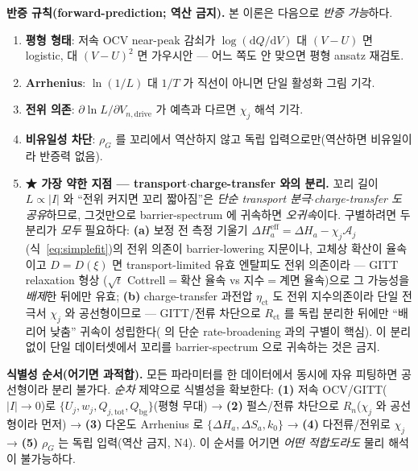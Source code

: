 \documentclass[11pt,a4paper]{article}
\newcommand{\dd}{\mathrm{d}}
\newcommand{\eff}{\mathrm{eff}}
\newcommand{\drive}{\mathrm{drive}}
\newcommand{\bg}{\mathrm{bg}}
\newcommand{\tot}{\mathrm{tot}}
\begin{document}
\textbf{반증 규칙(forward-prediction; 역산 금지).} 본 이론은 다음으로 \emph{반증 가능}하다.
\begin{enumerate}[label=\textbf{(N\arabic*)},leftmargin=2.8em,itemsep=1pt]
\item \textbf{평형 형태}: 저속 OCV near-peak 감쇠가 $\log(\dd Q/\dd V)$ 대 $(V-U)$ 면 logistic, 대 $(V-U)^2$ 면
  가우시안 — 어느 쪽도 안 맞으면 평형 ansatz 재검토.
\item \textbf{Arrhenius}: $\ln(1/L)$ 대 $1/T$ 가 직선이 아니면 단일 활성화 그림 기각.
\item \textbf{전위 의존}: $\partial\ln L/\partial V_{n,\drive}$ 가 예측과 다르면 $\chi_j$ 해석 기각.
\item \textbf{비유일성 차단}: $\rho_G$ 를 꼬리에서 역산하지 않고 독립 입력으로만(역산하면 비유일이라 반증력 없음).
\item \textbf{★ 가장 약한 지점 — transport$\cdot$charge-transfer 와의 분리.} 꼬리 길이 $L\propto|I|$ 와 ``전위 커지면
  꼬리 짧아짐''은 \emph{단순 transport 분극$\cdot$charge-transfer 도 공유}하므로, 그것만으로 barrier-spectrum 에
  귀속하면 \emph{오귀속}이다. 구별하려면 두 분리가 \emph{모두} 필요하다: \textbf{(a)} 보정 전 측정 기울기
  $\Delta H_a^{\eff}=\Delta H_a-\chi_j\mathcal A_j$(식~\eqref{eq:simplefit})의 전위 의존이 barrier-lowering 지문이나,
  고체상 확산이 율속이고 $D=D(\xi)$ 면 transport-limited 유효 엔탈피도 전위 의존이라 — GITT relaxation 형상
  ($\sqrt t$ Cottrell$=$확산 율속 vs 지수$=$계면 율속)으로 그 가능성을 \emph{배제}한 뒤에만 유효; \textbf{(b)}
  charge-transfer 과전압 $\eta_\mathrm{ct}$ 도 전위 지수의존이라 단일 전극서 $\chi_j$ 와 공선형이므로 — GITT/전류
  차단으로 $R_\mathrm{ct}$ 를 독립 분리한 뒤에만 ``배리어 낮춤'' 귀속이 성립한다(\cite{dubarry2022} 의 단순
  rate-broadening 과의 구별이 핵심). 이 분리 없이 단일 데이터셋에서 꼬리를 barrier-spectrum 으로 귀속하는 것은 금지.
\end{enumerate}

\textbf{식별성 순서(어기면 과적합).} 모든 파라미터를 한 데이터에서 동시에 자유 피팅하면 공선형이라 분리
불가다. \emph{순차} 제약으로 식별성을 확보한다: \textbf{(1)} 저속 OCV/GITT($|I|\to0$)로 $\{U_j,w_j,Q_{j,\tot},
Q_\bg\}$(평형 무대) → \textbf{(2)} 펄스/전류 차단으로 $R_n$($\chi_j$ 와 공선형이라 먼저) → \textbf{(3)} 다온도
Arrhenius 로 $\{\Delta H_a,\Delta S_a,k_0\}$ → \textbf{(4)} 다전류/전위로 $\chi_j$ → \textbf{(5)} $\rho_G$ 는
독립 입력(역산 금지, N4). 이 순서를 어기면 \emph{어떤 적합도라도} 물리 해석이 불가능하다.

\end{document}

